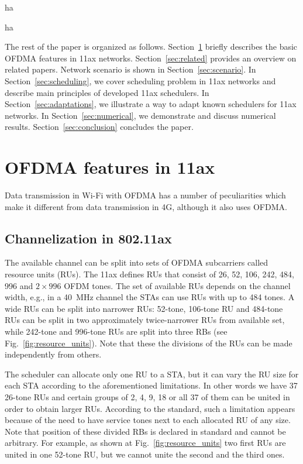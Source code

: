 ha

ha

The rest of the paper is organized as follows.
Section~\ref{sec:features} briefly describes the basic OFDMA features in 11ax networks.
Section~\ref{sec:related} provides an overview on related papers.
Network scenario is shown in Section~\ref{sec:scenario}.
In Section~\ref{sec:scheduling}, we cover scheduling problem in 11ax networks and describe main principles of developed 11ax schedulers.
In Section~\ref{sec:adaptations}, we illustrate a way to adapt known schedulers for 11ax networks.
In Section~\ref{sec:numerical}, we demonstrate and discuss numerical results. 
Section~\ref{sec:conclusion} concludes the paper.
\section{OFDMA features in 11ax}
\label{sec:features}

Data transmission in Wi-Fi with OFDMA has a number of peculiarities which make it different from data transmission in 4G, although it also uses OFDMA.

\subsection{Channelization in 802.11ax}
The available channel can be split into sets of OFDMA subcarriers called resource units (RUs).
The 11ax defines RUs that consist of 26, 52, 106, 242, 484, 996 and $2\times996$ OFDM tones.
The set of available RUs depends on the channel width, e.g., in a \SI{40}{\MHz} channel the STAs can use RUs with up to 484 tones.
A wide RUs can be split into narrower RUs: 52-tone, 106-tone RU and 484-tone RUs can be split in two approximately twice-narrower RUs from available set, while 242-tone and 996-tone RUs are split into three RBs (see Fig.~\ref{fig:resource_units}).
Note that these the divisions of the RUs can be made independently from others. 

The scheduler can allocate only one RU to a STA, but it can vary the RU size for each STA according to the aforementioned limitations.
In other words we have 37 26-tone RUs and certain groups of 2, 4, 9, 18 or all 37 of them can be united in order to obtain larger RUs.
According to the standard, such a limitation appears because of the need to have service tones next to each allocated RU of any size. 
Note that position of these divided RBs is declared in standard and cannot be arbitrary.
For example, as shown at Fig.~\ref{fig:resource_units} two first RUs are united in one 52-tone RU, but we cannot unite the second and the third ones.


